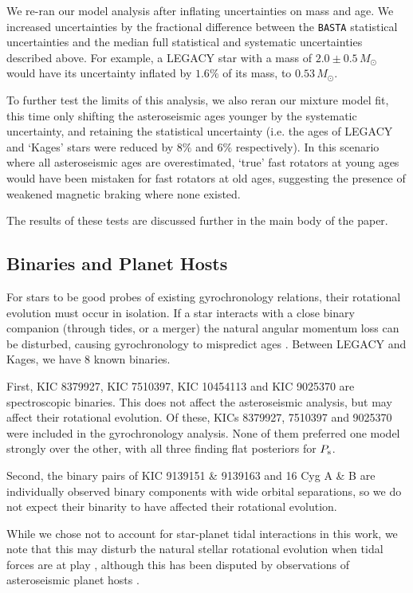 We re-ran our model analysis after inflating uncertainties on mass and age. We increased uncertainties by the fractional difference between the \texttt{BASTA} statistical uncertainties and the median full statistical and systematic uncertainties described above. For example, a LEGACY star with a mass of $2.0 \pm 0.5\, M_\odot$ would have its uncertainty inflated by $1.6\%$ of its mass, to $0.53\, M_\odot$. 

To further test the limits of this analysis, we also reran our mixture model fit, this time only shifting the asteroseismic ages younger by the systematic uncertainty, and retaining the statistical uncertainty (i.e. the ages of LEGACY and `Kages' stars were reduced by $8\%$ and $6\%$ respectively). In this scenario where all asteroseismic ages are overestimated, `true' fast rotators at young ages would have been mistaken for fast rotators at old ages, suggesting the presence of weakened magnetic braking where none existed. 

The results of these tests are discussed further in the main body of the paper.

\subsection{Binaries and Planet Hosts}
For stars to be good probes of existing gyrochronology relations, their rotational evolution must occur in isolation. If a star interacts with a close binary companion (through tides, or a merger) the natural angular momentum loss can be disturbed, causing gyrochronology to mispredict ages \cite{m_leiner+2019, m_fleming+2019}. Between LEGACY and Kages, we have 8 known binaries. 

First, KIC 8379927, KIC 7510397, KIC 10454113 and KIC 9025370 are spectroscopic binaries. This does not affect the asteroseismic analysis, but may affect their rotational evolution. Of these, KICs 8379927, 7510397 and 9025370 were included in the gyrochronology analysis. None of them preferred one model strongly over the other, with all three finding flat posteriors for $P_{\rm s}$.

Second, the binary pairs of KIC 9139151 \& 9139163 and 16 Cyg A \& B are individually observed binary components with wide orbital separations, so we do not expect their binarity to have affected their rotational evolution. 

While we chose not to account for star-planet tidal interactions in this work, we note that this may disturb the natural stellar rotational evolution when tidal forces are at play \cite{m_maxted+2015,m_gallet+delorme2019, m_benbakoura+2019}, although this has been disputed by observations of asteroseismic planet hosts \cite{m_ceillier+2016}.\\

